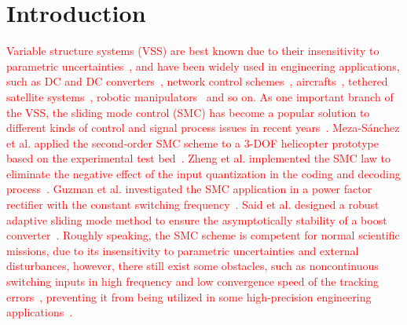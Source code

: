\documentclass[3p]{elsarticle}
\theoremstyle{plain}
\theoremstyle{remark}
\begin{document}
\section{Introduction}
\textcolor{red}{Variable structure systems (VSS) are best known due to their insensitivity to parametric uncertainties~\cite{slotine1991applied}, and have been widely used in engineering applications, such as DC and DC converters~\cite{Tan2008General}, network control schemes~\cite{Hou2016}, aircrafts~\cite{Loza2015Sensor}, tethered satellite systems~\cite{Ma201667}, robotic manipulators~\cite{Beak2016A} and so on. As one important branch of the VSS, the sliding mode control (SMC) has become a popular solution to different kinds of control and signal process issues in recent years~\cite{zhao2015nonlinear,zhang2015attitude}. Meza-S{\'a}nchez et al. applied the second-order SMC scheme to a 3-DOF helicopter prototype based on the experimental test bed~\cite{meza2015output}. Zheng et al. implemented the SMC law to eliminate the negative effect of the input quantization in the coding and decoding process~\cite{zheng2016sliding}. Guzman et al. investigated the SMC application in a power factor rectifier with the constant switching frequency~\cite{guzman2016sliding}. Said et al. designed a robust adaptive sliding mode method to ensure the asymptotically stability of a boost converter~\cite{oucheriah2013pwm}. Roughly speaking, the SMC scheme is competent for normal scientific missions, due to its insensitivity to parametric uncertainties and external disturbances, however, there still exist some obstacles, such as noncontinuous switching inputs in high frequency and low convergence speed of the tracking errors~\cite{boiko2013chattering,lee2009chattering}, preventing it from being utilized in some high-precision engineering applications~\cite{fridman2011sliding}.}
\end{document}
